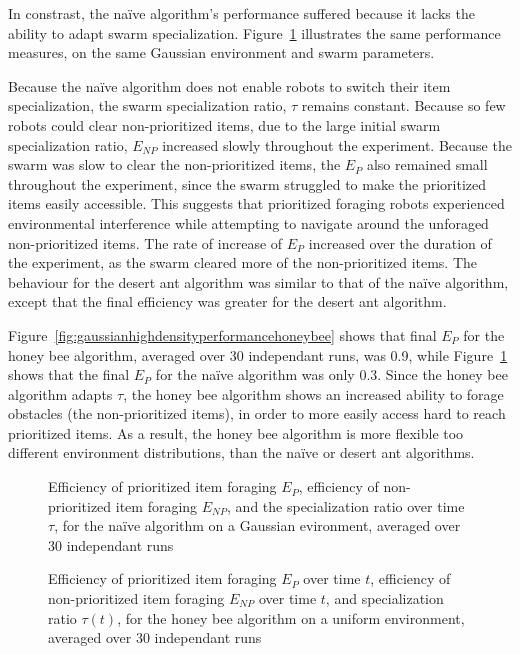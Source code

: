 In constrast, the na\"ive algorithm's performance suffered because it lacks the ability to adapt swarm specialization. Figure~\ref{fig:gaussianhighdensityperformancenaive} illustrates the same performance measures, on the same Gaussian environment and swarm parameters. 

Because the na\"ive algorithm does not enable robots to switch their item specialization, the swarm specialization ratio, $\tau$ remains constant. Because so few robots could clear non-prioritized items, due to the large initial swarm specialization ratio, $E_{NP}$ increased slowly throughout the experiment. Because the swarm was slow to clear the non-prioritized items, the $E_P$ also remained small throughout the experiment, since the swarm struggled to make the prioritized items easily accessible. This suggests that prioritized foraging robots experienced environmental interference while attempting to navigate around the unforaged non-prioritized items. The rate of increase of $E_P$ increased over the duration of the experiment, as the swarm cleared more of the non-prioritized items. The behaviour for the desert ant algorithm was similar to that of the na\"ive algorithm, except that the final efficiency was greater for the desert ant algorithm.


Figure~\ref{fig:gaussianhighdensityperformancehoneybee} shows that final $E_P$ for the honey bee algorithm, averaged over 30 independant runs, was 0.9, while Figure~\ref{fig:gaussianhighdensityperformancenaive} shows that the final $E_P$ for the na\"ive algorithm was only 0.3. Since the honey bee algorithm adapts $\tau$, the honey bee algorithm shows an increased ability to forage obstacles (the non-prioritized items), in order to more easily access hard to reach prioritized items. As a result, the honey bee algorithm is more flexible too different environment distributions, than the na\"ive or desert ant algorithms.

\begin{figure}[!htb]
\centering
\small
\resizebox{\textwidth}{!}{}
\caption{Efficiency of prioritized item foraging $E_P$, efficiency of non-prioritized item foraging $E_{NP}$, and the specialization ratio over time $\tau$, for the na\"ive algorithm on a Gaussian evironment, averaged over 30 independant runs}
\label{fig:gaussianhighdensityperformancenaive}
\end{figure}

\begin{figure}[!htb]
\centering
\small
\resizebox{\textwidth}{!}{}
\caption{Efficiency of prioritized item foraging $E_P$ over time $t$, efficiency of non-prioritized item foraging $E_{NP}$ over time $t$, and specialization ratio $\tau(t)$, for the honey bee algorithm on a uniform environment, averaged over 30 independant runs}
\label{fig:uniformhighdensityperformancehoneybee}
\end{figure}


